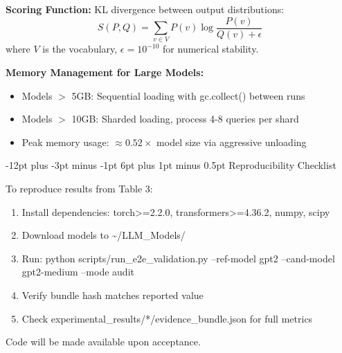 \documentclass[11pt]{article}
\makeatletter
\renewcommand\subsection{\@startsection{subsection}{2}{\z@}%
  {-12pt plus -3pt minus -1pt}%
  {6pt plus 1pt minus 0.5pt}%
  {\normalfont\large\bfseries}}
\makeatother
\begin{document}
\textbf{Scoring Function:} KL divergence between output distributions:
$$S(P, Q) = \sum_{v \in V} P(v) \log \frac{P(v)}{Q(v) + \epsilon}$$
where $V$ is the vocabulary, $\epsilon = 10^{-10}$ for numerical stability.

\textbf{Memory Management for Large Models:}
\begin{itemize}
\item Models $>$ 5GB: Sequential loading with gc.collect() between runs
\item Models $>$ 10GB: Sharded loading, process 4-8 queries per shard
\item Peak memory usage: $\approx 0.52 \times$ model size via aggressive unloading
\end{itemize}

\subsection{Reproducibility Checklist}

To reproduce results from Table 3:
\begin{enumerate}
\item Install dependencies: torch>=2.2.0, transformers>=4.36.2, numpy, scipy
\item Download models to \textasciitilde/LLM\_Models/
\item Run: python scripts/run\_e2e\_validation.py --ref-model gpt2 --cand-model gpt2-medium --mode audit
\item Verify bundle hash matches reported value
\item Check experimental\_results/*/evidence\_bundle.json for full metrics
\end{enumerate}

Code will be made available upon acceptance.
\end{document}
